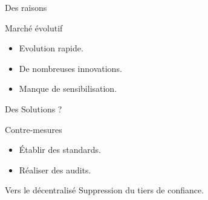 \begin{frame}{Des raisons }%
    \begin{block}{Marché évolutif}
        \begin{itemize}
            \item Evolution rapide.
            \item De nombreuses innovations.
            \item Manque de sensibilisation.
        \end{itemize}
    \end{block}

\end{frame}

\begin{frame}{Des Solutions ?}
    \begin{block}{Contre-mesures}
        \begin{itemize}
            \item Établir des standards. 
            \item Réaliser des audits.
        \end{itemize}
    \end{block}
    \pause
    \begin{block}{Vers le décentralisé}
        Suppression du tiers de confiance.
    \end{block}
\end{frame}

